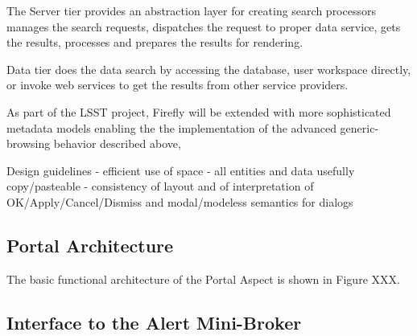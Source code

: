 The Server tier provides an abstraction layer for creating search processors manages the search requests, dispatches the request to proper data service, gets the results, processes and prepares the results for rendering.

Data tier does the data search by accessing the database, user workspace directly, or invoke web services to get the results from other service providers.


As part of the LSST project, Firefly will be extended with more sophisticated metadata models enabling the the implementation of the advanced generic-browsing behavior described above,

Design guidelines
- efficient use of space
- all entities and data usefully copy/pasteable
- consistency of layout and of interpretation of OK/Apply/Cancel/Dismiss and modal/modeless semantics for dialogs

\subsection{Portal Architecture}

The basic functional architecture of the Portal Aspect is shown in Figure XXX.

\subsection{Interface to the Alert Mini-Broker}

